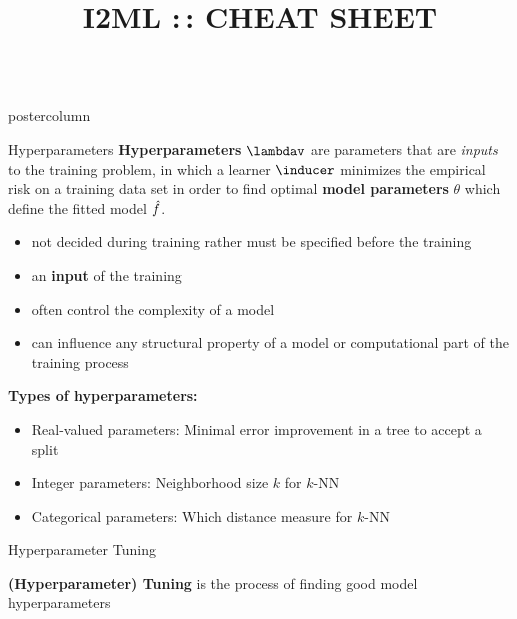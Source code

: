 \documentclass{beamer}
\title{I2ML :\,: CHEAT SHEET} %
\newlength{\columnheight} %
\begin{document}
\begin{frame}[fragile]{}
\begin{columns}
	\begin{column}{.31\textwidth}
		\begin{beamercolorbox}[center]{postercolumn}
			\begin{minipage}{.98\textwidth}
				\parbox[t][\columnheight]{\textwidth}{
					\begin{myblock}{Hyperparameters}
						\textbf{Hyperparameters} $\lambdav$ are parameters that are \emph{inputs} to the training problem, in which a learner $\inducer$ minimizes the empirical risk on a training data set in order to find optimal \textbf{model parameters} $\theta$ which define the fitted model $\hat{f}$.
						\begin{itemize}
                        \item not decided during training rather must be specified before the training
                        \item an \textbf{input} of the training
                        \item often control the complexity of a model
                        \item can influence any structural property of a model or computational part of the training process
                        \end{itemize}
						\hspace*{1ex}
				
						\begin{codebox}
			\textbf{Types of hyperparameters: }
						\end{codebox}
						\begin{itemize}
						    \item Real-valued parameters: Minimal error improvement in a tree to accept a split
						    \item Integer parameters: Neighborhood size $k$ for $k$-NN
						    \item Categorical parameters: Which distance measure for $k$-NN
						\end{itemize}
						\end{myblock}
						
					\begin{myblock}{Hyperparameter Tuning}
					
					\textbf{(Hyperparameter) Tuning} is the process of finding good model hyperparameters\\
					

\end{myblock}}
\end{minipage}
\end{beamercolorbox}
\end{column}
\end{columns}
\end{frame}
\end{document}
